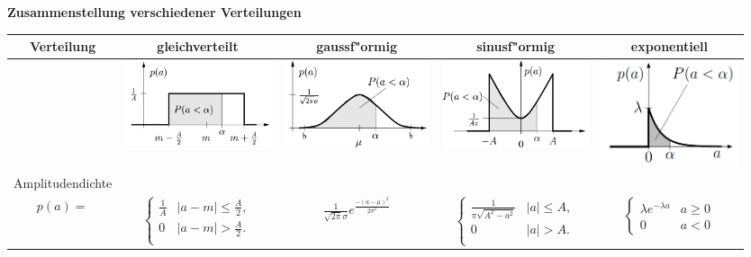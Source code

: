 \begin{table}
\begin{center}
\textbf{Zusammenstellung verschiedener Verteilungen } \\
\begin{tabular}{|c|c|c|c|c|}\hline
Verteilung & gleichverteilt & gaussf"ormig & sinusf"ormig & exponentiell\\ \hline\hline
 & 
	\includegraphics[width=4.3cm]{./bilder/verteilungen-gleichvert.png}
 &
	\includegraphics[width=4.3cm]{./bilder/verteilungen-gauss.png}
 &
	\includegraphics[width=4.3cm]{./bilder/verteilungen-sinus.png}
 &
	\includegraphics[width=4cm]{./bilder/verteilungen-expo.png} \\ \hline 
Amplitudendichte & & & & \\ $p(a)=$ & $\begin{cases} \frac{1}{A}&|a-m|\leq
\frac{A}{2},\\ 0&|a-m|>\frac{A}{2}.\\ \end{cases}$ &
$\displaystyle\frac{1}{\sqrt{2\pi}\sigma}e^{\displaystyle\frac{-(a-\mu)^2}{2\sigma^2}}$ & $\begin{cases} \frac{1}{\pi\sqrt{A^2-a^2}}&|a|\leq A,\\ 0&|a|>A.\\ \end{cases}$ &
 $\begin{cases} 
		\lambda e^{-\lambda a}  & a \geq 0\\
		0 & a < 0
	\end{cases}$\\ \hline  


\end{tabular}
\end{center}
\end{table}
